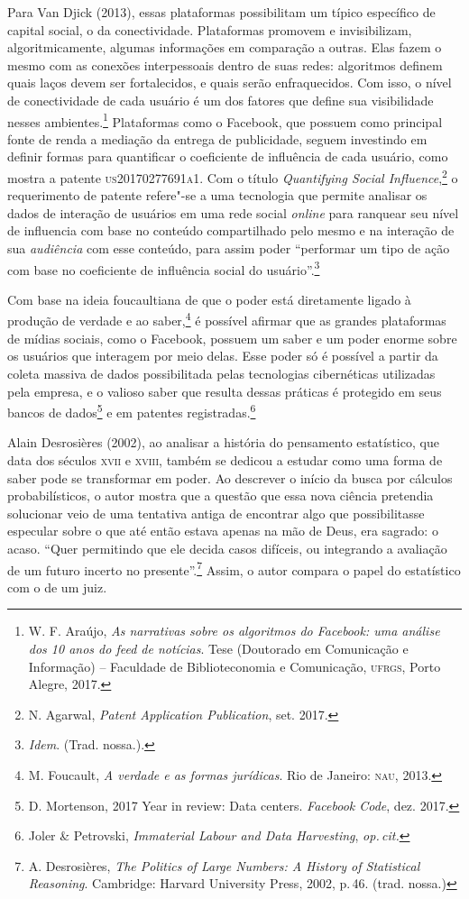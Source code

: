 Para Van Djick (2013), essas plataformas possibilitam um típico
específico de capital social, o da conectividade. Plataformas promovem e
invisibilizam, algoritmicamente, algumas informações em comparação a
outras. Elas fazem o mesmo com as conexões interpessoais dentro de suas
redes: algoritmos definem quais laços devem ser fortalecidos, e quais
serão enfraquecidos. Com isso, o nível de conectividade de cada usuário
é um dos fatores que define sua visibilidade nesses ambientes.\footnote{W. F. Araújo, \textit{As narrativas sobre os algoritmos do Facebook: uma
análise dos 10 anos do feed de notícias}. Tese (Doutorado em Comunicação e Informação) --
Faculdade de Biblioteconomia e Comunicação, \textsc{ufrgs}, Porto Alegre, 2017.} %
Plataformas como o Facebook, que possuem como
principal fonte de renda a mediação da entrega de publicidade, seguem
investindo em definir formas para quantificar o coeficiente de
influência de cada usuário, como mostra a patente \textsc{us20170277691a1}.
Com o título \textit{Quantifying Social Influence},\footnote{N. Agarwal, \textit{Patent Application Publication}, set. 2017.} o
requerimento de patente refere"-se a uma tecnologia que permite analisar
os dados de interação de usuários em uma rede social \textit{online} para
ranquear seu nível de influencia com base no conteúdo compartilhado pelo
mesmo e na interação de sua \textit{audiência} com esse conteúdo, para assim
poder ``performar um tipo de ação com base no coeficiente de influência
social do usuário''.\footnote{\textit{Idem}. (Trad. nossa.).}

Com base na ideia foucaultiana de que o poder está diretamente ligado à
produção de verdade e ao saber,\footnote{M. Foucault, \textit{A verdade e as formas jurídicas}. Rio de Janeiro: \textsc{nau}, 2013.}
é possível afirmar que as grandes plataformas de mídias sociais, como o
Facebook, possuem um saber e um poder enorme sobre os usuários que
interagem por meio delas. Esse poder só é possível a partir da coleta
massiva de dados possibilitada pelas tecnologias cibernéticas utilizadas
pela empresa, e o valioso saber que resulta dessas práticas é protegido
em seus bancos de dados\footnote{D. Mortenson, 2017 Year in review: Data centers. \textit{Facebook Code}, dez. 2017.} e em patentes registradas.\footnote{Joler \& Petrovski, \textit{Immaterial Labour and Data Harvesting}, \textit{op.\,cit.}}

Alain Desrosières (2002), ao analisar a história do pensamento estatístico, que data dos séculos
\textsc{xvii} e \textsc{xviii}, também se dedicou a estudar como uma forma de saber pode
se transformar em poder. Ao descrever o início da busca por cálculos
probabilísticos, o autor mostra que a questão que essa nova ciência
pretendia solucionar veio de uma tentativa antiga de encontrar algo que
possibilitasse especular sobre o que até então estava apenas na mão de
Deus, era sagrado: o acaso. ``Quer permitindo que ele decida casos
difíceis, ou integrando a avaliação de um futuro incerto no
presente''.\footnote{A. Desrosières, \textit{The Politics of Large Numbers: A History of
Statistical Reasoning}. Cambridge: Harvard University Press, 2002, p.\,46. (trad. nossa.)} Assim, o autor compara o papel
do estatístico com o de um juiz.

